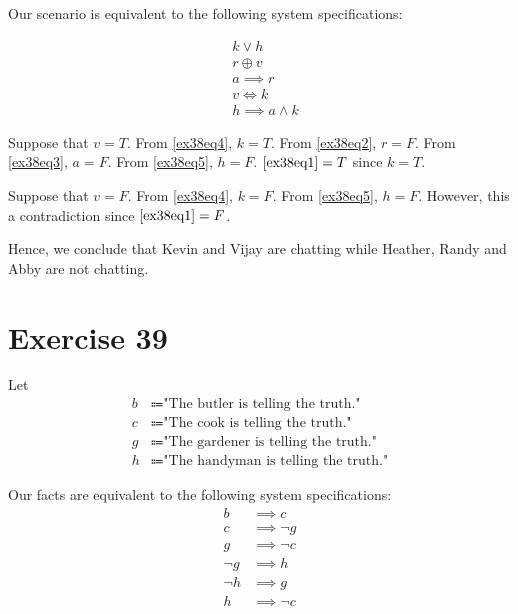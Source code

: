 \documentclass{article}
\begin{document}
Our scenario is equivalent to the following system specifications:

\begin{align}
	 & k \lor h \label{ex38eq1}             \\
	 & r \oplus v \label{ex38eq2}           \\
	 & a \implies r \label{ex38eq3}         \\
	 & v \iff k \label{ex38eq4}             \\
	 & h \implies a \land k \label{ex38eq5}
\end{align}

Suppose that $v = T$. From \eqref{ex38eq4}, $k = T$. From \eqref{ex38eq2}, $r = F$. From \eqref{ex38eq3}, $a = F$. From \eqref{ex38eq5}, $h = F$. $\eqref{ex38eq1} = T$ since $k = T$.

Suppose that $v = F$. From \eqref{ex38eq4}, $k = F$. From \eqref{ex38eq5}, $h = F$.  However, this a contradiction since $\eqref{ex38eq1} = F$.

Hence, we conclude that Kevin and Vijay are chatting while Heather, Randy and Abby are not chatting.

\pagebreak

\section{Exercise 39}
Let
\begin{align*}
	b & \Coloneqq \text{"The butler is telling the truth."}   \\
	c & \Coloneqq \text{"The cook is telling the truth."}     \\
	g & \Coloneqq \text{"The gardener is telling the truth."} \\
	h & \Coloneqq \text{"The handyman is telling the truth."}
\end{align*}

Our facts are equivalent to the following system specifications:
\begin{align}
	b      & \implies c \label{ex39eq1}      \\
	c      & \implies \neg g \label{ex39eq2} \\
	g      & \implies \neg c \label{ex39eq3} \\
	\neg g & \implies h \label{ex39eq4}      \\
	\neg h & \implies g \label{ex39eq5}      \\
	h      & \implies \neg c \label{ex39eq6}
\end{align}
\end{document}
